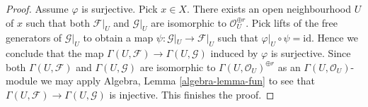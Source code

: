 \documentclass[10pt,a4paper]{amsart}
\theoremstyle{plain}
\theoremstyle{definition}
\theoremstyle{remark}
\numberwithin{equation}{subsection}
\begin{document}
\begin{proof}
Assume $\varphi$ is surjective. Pick $x \in X$.
There exists an open neighbourhood $U$ of $x$
such that both $\mathcal{F}|_U$ and $\mathcal{G}|_U$ are
isomorphic to $\mathcal{O}_U^{\oplus r}$.
Pick lifts of the free generators of $\mathcal{G}|_U$
to obtain a map $\psi : \mathcal{G}|_U \to \mathcal{F}|_U$
such that $\varphi|_U \circ \psi = \text{id}$.
Hence we conclude that the map
$\Gamma(U, \mathcal{F}) \to \Gamma(U, \mathcal{G})$
induced by $\varphi$ is surjective. Since both
$\Gamma(U, \mathcal{F})$ and $\Gamma(U, \mathcal{G})$
are isomorphic to $\Gamma(U, \mathcal{O}_U)^{\oplus r}$
as an $\Gamma(U, \mathcal{O}_U)$-module we may
apply Algebra, Lemma \ref{algebra-lemma-fun} to see that
$\Gamma(U, \mathcal{F}) \to \Gamma(U, \mathcal{G})$
is injective. This finishes the proof.
\end{proof}
\end{document}
